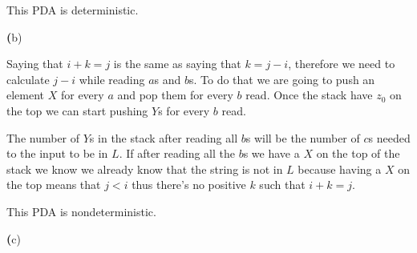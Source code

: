 \documentclass[11pt]{article}
\renewcommand{\part}[1] {{\vspace{0.15in}\noindent\textbf (#1)} \vspace{0.10in}}
\begin{document}
This PDA is deterministic.


\part{b}

Saying that $i + k = j$ is the same as saying that $k = j - i$, therefore we need to calculate $j- i$ while reading $a$s and $b$s. To do that we are going to push an element $X$ for every $a$ and pop them for every $b$ read. Once the stack have $z_0$ on the top we can start pushing $Y$s for every $b$ read. 

The number of $Y$s in the stack after reading all $b$s will be the number of $c$s needed to the input to be in $L$. If after reading all the $b$s we have a $X$ on the top of the stack we know we already know that the string is not in $L$ because having a $X$ on the top means that $j < i$ thus there's no positive $k$ such that $i + k = j$.


This PDA is nondeterministic.

\part{c}
\end{document}
